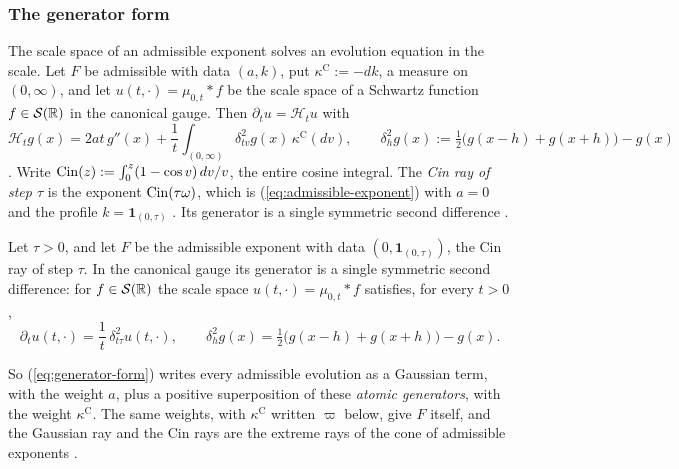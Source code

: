 \subsubsection{The generator form}
\label{subsec:cited-generator}

The scale space of an admissible exponent solves an evolution equation in the scale. Let $F$ be
admissible with data $(a, k)$, put $\kappa^{\mathrm C} := -dk$, a measure on $(0,\infty)$, and let
$u(t,\cdot) = \mu_{0,t} * f$ be the scale space of a Schwartz function $f \in \mathcal{S}(\mathbb{R})$ in
the canonical gauge. Then $\partial_t u = \mathcal{H}_t u$ with
\begin{equation}
\label{eq:generator-form}
  \mathcal{H}_t g(x) = 2at\,g''(x) + \frac1t\int_{(0,\infty)}\delta^2_{tv}g(x)\,
  \kappa^{\mathrm C}(dv), \qquad
  \delta^2_h g(x) := \tfrac12\bigl(g(x - h) + g(x + h)\bigr) - g(x)
\end{equation}
. Write
$\operatorname{Cin}(z) := \int_0^z(1 - \cos v)\,dv/v$, the entire cosine integral. The \emph{Cin ray of step
$\tau$} is the exponent $\operatorname{Cin}(\tau\omega)$, which is (\ref{eq:admissible-exponent}) with $a = 0$ and
the profile $k = \mathbf{1}_{(0,\tau)}$ . Its generator is a
single symmetric second difference .

\begin{theorem}
\label{thm:cited-A13}

Let $\tau > 0$, and let $F$ be the admissible exponent with data $(0, \mathbf{1}_{(0,\tau)})$, the
Cin ray of step $\tau$. In the canonical gauge its generator is a single symmetric second
difference: for $f \in \mathcal{S}(\mathbb{R})$ the scale space $u(t,\cdot) = \mu_{0,t} * f$ satisfies,
for every $t > 0$,
\[
  \partial_t u(t,\cdot) = \frac1t\,\delta^2_{t\tau}u(t,\cdot), \qquad
  \delta^2_h g(x) = \tfrac12\bigl(g(x - h) + g(x + h)\bigr) - g(x).
\]
\end{theorem}

So (\ref{eq:generator-form}) writes every admissible evolution as a Gaussian term, with the weight
$a$, plus a positive superposition of these \emph{atomic generators}, with the weight
$\kappa^{\mathrm C}$. The same weights, with $\kappa^{\mathrm C}$ written $\varpi$ below, give $F$
itself, and the Gaussian ray and the Cin rays are the extreme rays of the cone of admissible
exponents .

